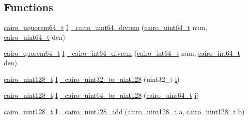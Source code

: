 \subsection*{Functions}
\begin{DoxyCompactItemize}
\item 
\hyperlink{cairo-wideint-private_8h_aab2ad7e0f3441227d9339be2baa8b986}{cairo\+\_\+uquorem64\+\_\+t} \hyperlink{cairo-wideint-private_8h_a60ef6e1bcfabb95cfeb300e1d03ce470}{I} \hyperlink{cairo-wideint-private_8h_ab39e976db2bfc2b065d328db29791f6f}{\+\_\+cairo\+\_\+uint64\+\_\+divrem} (\hyperlink{cairo-wideint-private_8h_addac97960d28a0f1b58a5abefd21b14b}{cairo\+\_\+uint64\+\_\+t} num, \hyperlink{cairo-wideint-private_8h_addac97960d28a0f1b58a5abefd21b14b}{cairo\+\_\+uint64\+\_\+t} den)
\item 
\hyperlink{cairo-wideint-private_8h_af1cd8d1d4bd4c1ec92c27c22e8f0123b}{cairo\+\_\+quorem64\+\_\+t} \hyperlink{cairo-wideint-private_8h_a60ef6e1bcfabb95cfeb300e1d03ce470}{I} \hyperlink{cairo-wideint-private_8h_ad20421b587751b99a50940a96ebd5102}{\+\_\+cairo\+\_\+int64\+\_\+divrem} (\hyperlink{cairo-wideint-private_8h_a31b93307f43703e28eef43fad0166834}{cairo\+\_\+int64\+\_\+t} num, \hyperlink{cairo-wideint-private_8h_a31b93307f43703e28eef43fad0166834}{cairo\+\_\+int64\+\_\+t} den)
\item 
\hyperlink{cairo-wideint-private_8h_ab99b9c539c5f08b381ec3797b3fcd872}{cairo\+\_\+uint128\+\_\+t} \hyperlink{cairo-wideint-private_8h_a60ef6e1bcfabb95cfeb300e1d03ce470}{I} \hyperlink{cairo-wideint-private_8h_a13541aff966313b7b4a1a34bbbb4f57b}{\+\_\+cairo\+\_\+uint32\+\_\+to\+\_\+uint128} (uint32\+\_\+t \hyperlink{lte__uplink__power__control_8m_a6f6ccfcf58b31cb6412107d9d5281426}{i})
\item 
\hyperlink{cairo-wideint-private_8h_ab99b9c539c5f08b381ec3797b3fcd872}{cairo\+\_\+uint128\+\_\+t} \hyperlink{cairo-wideint-private_8h_a60ef6e1bcfabb95cfeb300e1d03ce470}{I} \hyperlink{cairo-wideint-private_8h_acae234e92a3589be194bec667e5e0565}{\+\_\+cairo\+\_\+uint64\+\_\+to\+\_\+uint128} (\hyperlink{cairo-wideint-private_8h_addac97960d28a0f1b58a5abefd21b14b}{cairo\+\_\+uint64\+\_\+t} \hyperlink{lte__uplink__power__control_8m_a6f6ccfcf58b31cb6412107d9d5281426}{i})
\item 
\hyperlink{cairo-wideint-private_8h_ab99b9c539c5f08b381ec3797b3fcd872}{cairo\+\_\+uint128\+\_\+t} \hyperlink{cairo-wideint-private_8h_a60ef6e1bcfabb95cfeb300e1d03ce470}{I} \hyperlink{cairo-wideint-private_8h_a0f85dd4a6e416e048cadd2049c48a390}{\+\_\+cairo\+\_\+uint128\+\_\+add} (\hyperlink{cairo-wideint-private_8h_ab99b9c539c5f08b381ec3797b3fcd872}{cairo\+\_\+uint128\+\_\+t} a, \hyperlink{cairo-wideint-private_8h_ab99b9c539c5f08b381ec3797b3fcd872}{cairo\+\_\+uint128\+\_\+t} \hyperlink{lte__pathloss_8m_a21ad0bd836b90d08f4cf640b4c298e7c}{b})

\end{DoxyCompactItemize}
